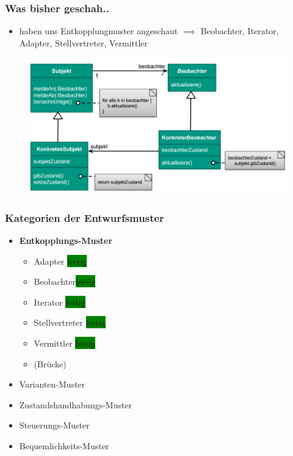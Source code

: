 \documentclass[18pt]{beamer}
\begin{document}
	\begin{frame}
		\frametitle{Was bisher geschah..}
		\begin{itemize}
			\item haben uns Entkopplungmuster angeschaut
			\linebreak $\implies$ Beobachter, Iterator, Adapter, Stellvertreter, Vermittler
		\end{itemize}
		\begin{figure}
			\includegraphics[scale=0.35]{./pics/tut3/obs.png}
		\end{figure}
	\end{frame}

	\begin{frame}
		\frametitle{Kategorien der Entwurfsmuster}
		\begin{itemize}
			\item \textbf{Entkopplungs-Muster}
			\begin{itemize}
				\item Adapter \colorbox{green}{fertig}
				\item Beobachter\colorbox{green}{fertig}
				\item Iterator \colorbox{green}{fertig}
				\item Stellvertreter \colorbox{green}{fertig}
				\item Vermittler \colorbox{green}{fertig}
				\item (Brücke)
			\end{itemize}
			\item Varianten-Muster
			\item Zustandshandhabungs-Muster
			\item Steuerungs-Muster
			\item Bequemlichkeits-Muster
		\end{itemize}
	\end{frame}
\end{document}
